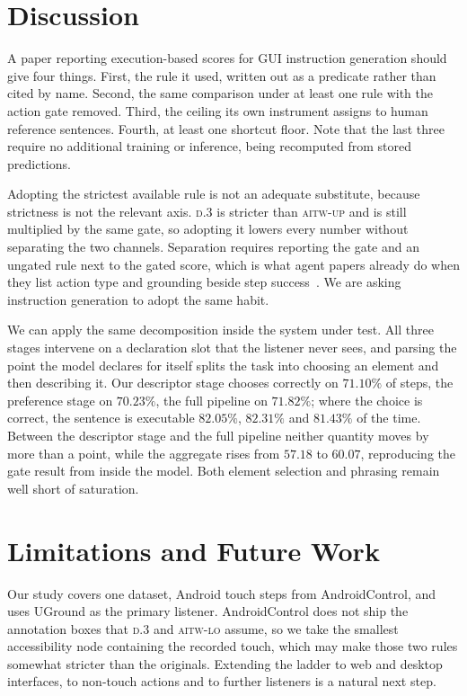 \documentclass[runningheads,a4paper]{llncs}
\newcommand{\rulename}[1]{\textsc{#1}}
\begin{document}
\section{Discussion}
\label{sec:disc}

A paper reporting execution-based scores for GUI instruction generation should give four things.
First, the rule it used, written out as a predicate rather than cited by name. Second, the same
comparison under at least one rule with the action gate removed. Third, the ceiling its own
instrument assigns to human reference sentences. Fourth, at least one shortcut floor. Note that the last three require no additional training or inference, being
recomputed from stored predictions.

Adopting the strictest available rule is not an adequate substitute, because strictness is not
the relevant axis. \rulename{d.3} is stricter than \rulename{aitw-up} and is still multiplied by the
same gate, so adopting it lowers every number without separating the two channels. Separation
requires reporting the gate and an ungated rule next to the gated score, which is what agent
papers already do when they list action type and grounding beside step success~\cite{osatlas}.
We are asking instruction generation to adopt the same habit.

We can apply the same decomposition inside the system under test. All three stages intervene on a
declaration slot that the listener never sees, and parsing the point the model declares for
itself splits the task into choosing an element and then describing it. Our
descriptor stage chooses correctly on $71.10\%$ of steps, the preference stage on $70.23\%$, the
full pipeline on $71.82\%$; where the choice is correct, the sentence is executable $82.05\%$,
$82.31\%$ and $81.43\%$ of the time. Between the descriptor stage and the full pipeline neither quantity moves by more than a point,
while the aggregate rises from $57.18$ to $60.07$, reproducing the gate result from inside the model. Both
element selection and phrasing remain well short of saturation.

\section{Limitations and Future Work}
\label{sec:limits}

Our study covers one dataset, Android touch steps from AndroidControl, and uses UGround as the
primary listener. AndroidControl does not ship the annotation boxes that \rulename{d.3} and
\rulename{aitw-lo} assume, so we take the smallest accessibility node containing the recorded
touch, which may make those two rules somewhat stricter than the originals. Extending the ladder
to web and desktop interfaces, to non-touch actions and to further listeners is a natural next
step.
\end{document}
